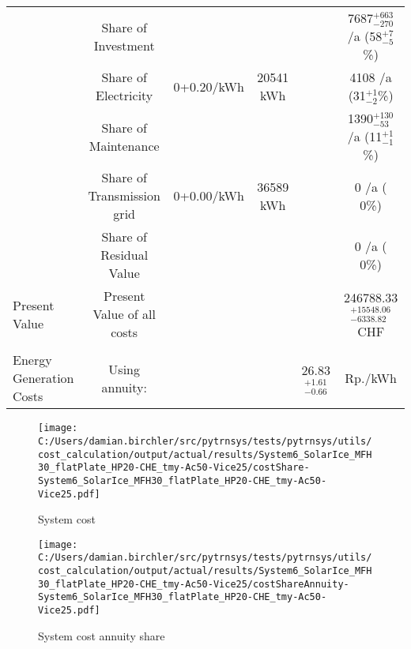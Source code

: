 \documentclass[english]{SPFShortReport}
\begin{document}
\begin{table}[!ht]
\begin{adjustbox}{max width =\textwidth}
\begin{tabular}{l | c c c c c }
 & Share of Investment & &&& 7687$^{\mathrm{+663}}_{\mathrm{-270}}$ /a (58$^{\mathrm{+ 7}}_{\mathrm{- 5}}$\%) \\
 & Share of Electricity & 0+0.20/kWh & 20541 kWh &  & 4108 /a (31$^{\mathrm{+ 1}}_{\mathrm{- 2}}$\%)\\
 & Share of Maintenance & &&& 1390$^{\mathrm{+130}}_{\mathrm{-53}}$ /a (11$^{\mathrm{+ 1}}_{\mathrm{- 1}}$\%)\\ 
 & Share of Transmission grid & 0+0.00/kWh & 36589 kWh & &  0 /a ( 0\%)\\
 & Share of Residual Value &&& &  0 /a ( 0\%)\\
Present Value  & Present Value of all costs  & &&& 246788.33$^{\mathrm{+15548.06}}_{\mathrm{-6338.82}}$ CHF \\
\hline \\ 
 Energy Generation Costs & Using annuity: &&& 26.83$^{\mathrm{+1.61}}_{\mathrm{-0.66}}$ & Rp./kWh \\
\hline
\hline
\end{tabular}
\end{adjustbox}
\label{CostsTable}
\end{table}
\begin{figure}[!htbp]
\begin{center}
\texttt{[image: C:/Users/damian.birchler/src/pytrnsys/tests/pytrnsys/utils/cost\_calculation/output/actual/results/System6\_SolarIce\_MFH30\_flatPlate\_HP20-CHE\_tmy-Ac50-Vice25/costShare-System6\_SolarIce\_MFH30\_flatPlate\_HP20-CHE\_tmy-Ac50-Vice25.pdf]}
\caption{System cost}
\label{systemCost}
\end{center}
\end{figure}
\begin{figure}[!htbp]
\begin{center}
\texttt{[image: C:/Users/damian.birchler/src/pytrnsys/tests/pytrnsys/utils/cost\_calculation/output/actual/results/System6\_SolarIce\_MFH30\_flatPlate\_HP20-CHE\_tmy-Ac50-Vice25/costShareAnnuity-System6\_SolarIce\_MFH30\_flatPlate\_HP20-CHE\_tmy-Ac50-Vice25.pdf]}
\caption{System cost annuity share}
\label{systemCostannuity}
\end{center}
\end{figure}
\end{document}
